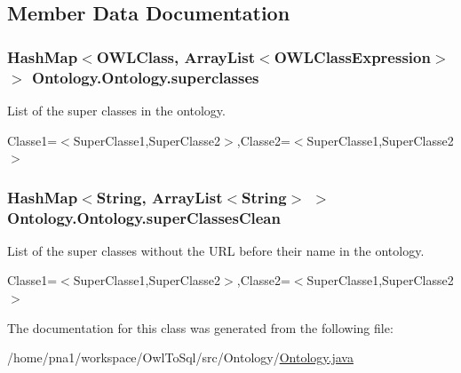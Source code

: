 \subsection{Member Data Documentation}
\hypertarget{class_ontology_1_1_ontology_a0a5224da294ff4af352081031305f799}{
\subsubsection[{superclasses}]{\setlength{\rightskip}{0pt plus 5cm}HashMap$<$OWLClass, ArrayList$<$OWLClassExpression$>$ $>$ {\bf Ontology.Ontology.superclasses}}}
\label{class_ontology_1_1_ontology_a0a5224da294ff4af352081031305f799}


List of the super classes in the ontology. 

Classe1=$<$SuperClasse1,SuperClasse2$>$,Classe2=$<$SuperClasse1,SuperClasse2$>$ \hypertarget{class_ontology_1_1_ontology_a08165d8cd889ef937321671134aae060}{
\subsubsection[{superClassesClean}]{\setlength{\rightskip}{0pt plus 5cm}HashMap$<$String, ArrayList$<$String$>$ $>$ {\bf Ontology.Ontology.superClassesClean}}}
\label{class_ontology_1_1_ontology_a08165d8cd889ef937321671134aae060}


List of the super classes without the URL before their name in the ontology. 

Classe1=$<$SuperClasse1,SuperClasse2$>$,Classe2=$<$SuperClasse1,SuperClasse2$>$ 

The documentation for this class was generated from the following file:\begin{DoxyCompactItemize}
\item 
/home/pna1/workspace/OwlToSql/src/Ontology/\hyperlink{_ontology_8java}{Ontology.java}\end{DoxyCompactItemize}
